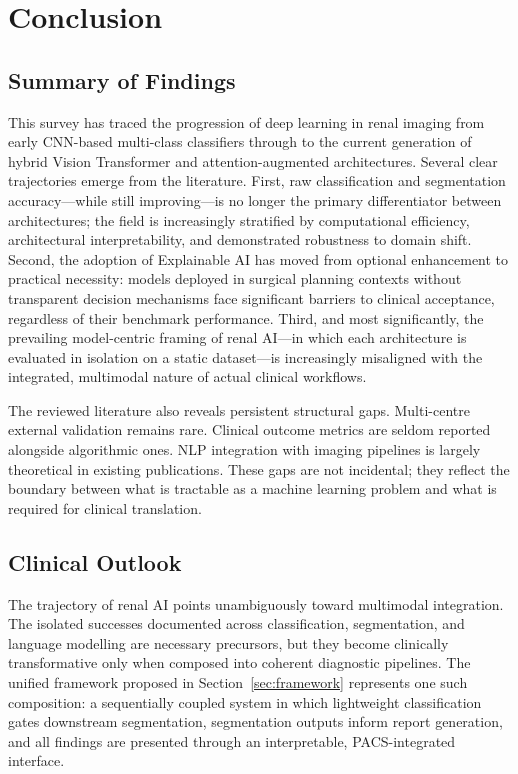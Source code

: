 

\section{Conclusion}
\label{sec:conclusion}


\subsection{Summary of Findings}
\label{subsec:summary}

This survey has traced the progression of deep learning in renal imaging from early CNN-based multi-class classifiers through to the current generation of hybrid Vision Transformer and attention-augmented architectures. Several clear trajectories emerge from the literature. First, raw classification and segmentation accuracy---while still improving---is no longer the primary differentiator between architectures; the field is increasingly stratified by computational efficiency, architectural interpretability, and demonstrated robustness to domain shift. Second, the adoption of Explainable AI has moved from optional enhancement to practical necessity: models deployed in surgical planning contexts without transparent decision mechanisms face significant barriers to clinical acceptance, regardless of their benchmark performance. Third, and most significantly, the prevailing model-centric framing of renal AI---in which each architecture is evaluated in isolation on a static dataset---is increasingly misaligned with the integrated, multimodal nature of actual clinical workflows.

The reviewed literature also reveals persistent structural gaps. Multi-centre external validation remains rare. Clinical outcome metrics are seldom reported alongside algorithmic ones. NLP integration with imaging pipelines is largely theoretical in existing publications. These gaps are not incidental; they reflect the boundary between what is tractable as a machine learning problem and what is required for clinical translation.

\subsection{Clinical Outlook}
\label{subsec:outlook}

The trajectory of renal AI points unambiguously toward multimodal integration. The isolated successes documented across classification, segmentation, and language modelling are necessary precursors, but they become clinically transformative only when composed into coherent diagnostic pipelines. The unified framework proposed in Section~\ref{sec:framework} represents one such composition: a sequentially coupled system in which lightweight classification gates downstream segmentation, segmentation outputs inform report generation, and all findings are presented through an interpretable, PACS-integrated interface.

